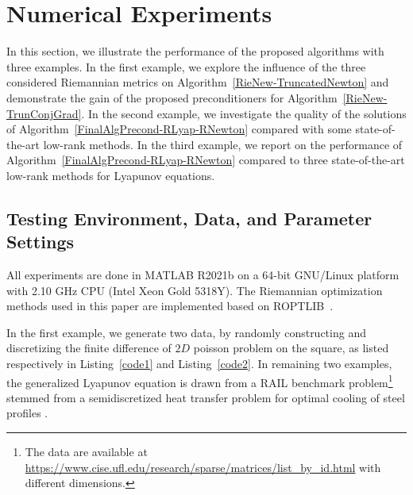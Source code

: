 \documentclass[11pt]{article}
\newcommand{\whcomm}[2]{{\sf\color{purple} #1}{\sf\color{blue} #2}}
\numberwithin{equation}{section}
\begin{document}

\section{Numerical Experiments} \label{NumExp} 


In this section, we illustrate the performance of the proposed algorithms with three examples. In the first example, we explore the influence of the three considered Riemannian metrics on Algorithm~\ref{RieNew-TruncatedNewton} and demonstrate the gain of the proposed preconditioners for Algorithm~\ref{RieNew-TrunConjGrad}. In the second example, we investigate the quality of the solutions of Algorithm~\ref{FinalAlgPrecond-RLyap-RNewton} compared with some state-of-the-art low-rank methods. In the third example, we report on the performance of Algorithm~\ref{FinalAlgPrecond-RLyap-RNewton} compared to three state-of-the-art low-rank methods for Lyapunov equations. 


\subsection{Testing Environment, Data, and Parameter Settings}

All experiments are done in MATLAB R2021b on a 64-bit GNU/Linux platform with 2.10 GHz CPU (Intel Xeon Gold 5318Y). The Riemannian optimization methods used in this paper are implemented based on ROPTLIB~\cite{HAGH18}. %

In the first example, we generate two data, by randomly constructing and discretizing the finite difference of $2D$ poisson problem on the square, as listed respectively in Listing~\ref{code1} and Listing~\ref{code2}. In remaining two examples, the generalized Lyapunov equation is drawn from a RAIL benchmark problem\footnote{The data are available at \href{https://www.cise.ufl.edu/research/sparse/matrices/list\_by\_id.html}{https://www.cise.ufl.edu/research/sparse/matrices/list\_by\_id.html} with different dimensions.} stemmed from a semidiscretized heat transfer problem for optimal cooling of steel profiles \cite{Benner2005ASH, Saak2004EfficientNS}. 
\end{document}
